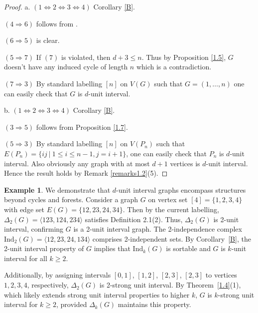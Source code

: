 \documentclass[12pt,reqno]{amsart}
\theoremstyle{plain}
\theoremstyle{definition}
\newtheorem{example}[theorem]{Example}
\numberwithin{equation}{section}
\begin{document}
\begin{proof}
a. $(1 \Longleftrightarrow 2 \Longleftrightarrow 3 \Longleftrightarrow 4)$  Corollary \ref{B}.

$(4 \Longrightarrow 6)$ follows from \cite[Theorem 50]{B+S+V}.

$(6 \Longrightarrow 5)$ is clear.

$(5 \Longrightarrow 7)$ If $(7)$ is violated, then $d+3\leq n$. Thus by Proposition \ref{1.5}, $G$ doesn't have any induced cycle of length $n$ which is a contradiction.

$(7 \Longrightarrow 3)$ By standard labelling $[n]$ on $V(G)$ such that $G=(1, \dots , n)$ one can easily check that $G$ is $d$-unit interval.

b. $(1 \Longleftrightarrow 2 \Longleftrightarrow 3 \Longleftrightarrow 4)$ Corollary \ref{B}.

$(3 \Longrightarrow 5)$ follows from Proposition \ref{1.7}.

$(5 \Longrightarrow 3)$ By standard labelling $[n]$ on $V(P_n)$ such that $E(P_n)=\{ij \ | \ 1\leq i \leq n-1, j=i+1\}$, one can easily check that $P_n$ is $d$-unit interval. Also obviously any graph with at most $d+1$ vertices is $d$-unit interval. Hence the result holds by Remark \ref{remarks1.2}(5).
\end{proof}

\begin{example}
We demonstrate that $d$-unit interval graphs encompass structures beyond cycles and forests. Consider a graph $G$ on vertex set $[4] = \{1, 2, 3, 4\}$ with edge set $E(G) = \{12, 23, 24, 34\}$.  Then by the current labelling, $\Delta_2(G)=\langle 123, 124, 234\rangle$ satisfies Definition 2.1(2). Thus, $\Delta_2(G)$ is 2-unit interval, confirming $G$ is a 2-unit interval graph. The 2-independence complex $\mathrm{Ind}_2(G) = \langle 12, 23, 24, 134 \rangle$ comprises 2-independent sets. By Corollary~\ref{B}, the 2-unit interval property of $G$ implies that $\mathrm{Ind}_k(G)$ is sortable and $G$ is $k$-unit interval for all $k\geq 2$.

Additionally, by assigning intervals $[0, 1]$, $[1, 2]$, $[2, 3]$, $[2, 3]$ to vertices $1, 2, 3, 4$, respectively, $\Delta_2(G)$ is 2-strong unit interval.  By Theorem~\ref{1.4}(1), which likely extends strong unit interval properties to higher $k$, $G$ is $k$-strong unit interval for $k \geq 2$, provided $\Delta_k(G)$ maintains this property. 
 \end{example}

\end{document}
